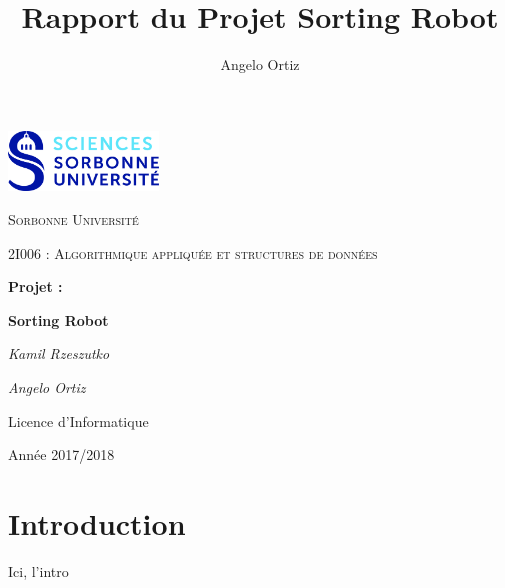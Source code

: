 \documentclass[12pt,a4paper]{article}
\author{Angelo Ortiz}
\title{Rapport du Projet Sorting Robot}
\begin{document}
\begin{titlepage}
  \centering
  \includegraphics[width=0.30\textwidth]{logo.jpg}\par\vspace{1cm}
  {\scshape\LARGE Sorbonne Universit\'e\par}
  \vspace{1cm}
  {\scshape\Large 2I006 : Algorithmique appliqu\'ee et structures de 
donn\'ees\par}
  \vspace{1.5cm}
  {\Large \bfseries Projet :\par}
  {\huge\bfseries Sorting Robot\par}
  \vspace{2cm}
  {\Large\itshape Kamil Rzeszutko\par}
  {\Large\itshape Angelo Ortiz\par}
  \vfill
  
  {\large Licence d'Informatique\par}
  {\large Ann\'ee 2017/2018\par}
\end{titlepage}
 
\tableofcontents
  
\newpage
  
\section{Introduction}
Ici, l'intro

\newpage
\end{document}
